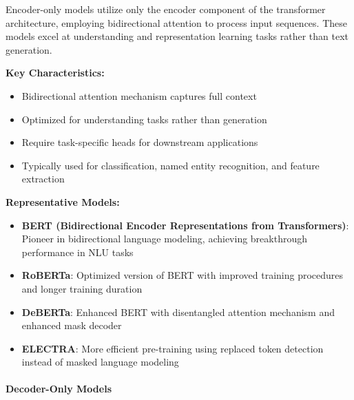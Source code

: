\documentclass[12pt,a4paper]{article}
\begin{document}
Encoder-only models utilize only the encoder component of the transformer architecture, employing bidirectional attention to process input sequences. These models excel at understanding and representation learning tasks rather than text generation.

\textbf{Key Characteristics:}
\begin{itemize}
    \item Bidirectional attention mechanism captures full context
    \item Optimized for understanding tasks rather than generation
    \item Require task-specific heads for downstream applications
    \item Typically used for classification, named entity recognition, and feature extraction
\end{itemize}

\textbf{Representative Models:}
\begin{itemize}
    \item \textbf{BERT (Bidirectional Encoder Representations from Transformers)}: Pioneer in bidirectional language modeling, achieving breakthrough performance in NLU tasks
    \item \textbf{RoBERTa}: Optimized version of BERT with improved training procedures and longer training duration
    \item \textbf{DeBERTa}: Enhanced BERT with disentangled attention mechanism and enhanced mask decoder
    \item \textbf{ELECTRA}: More efficient pre-training using replaced token detection instead of masked language modeling
\end{itemize}

\paragraph{Decoder-Only Models}
\end{document}
